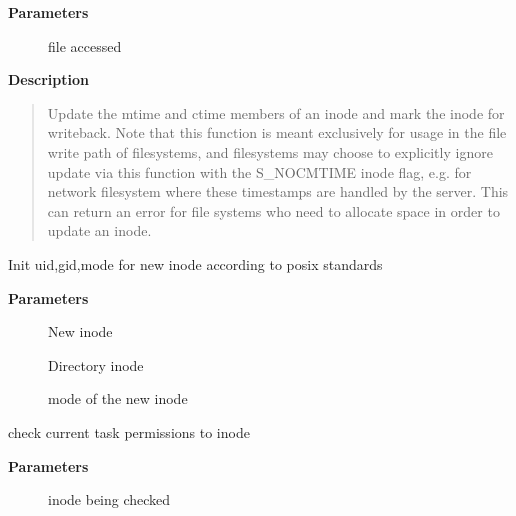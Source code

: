 \documentclass[a4paper,8pt,english]{sphinxmanual}
\begin{document}
\textbf{Parameters}
\begin{description}
\item[{}] \leavevmode
file accessed

\end{description}

\textbf{Description}
\begin{quote}

Update the mtime and ctime members of an inode and mark the inode
for writeback.  Note that this function is meant exclusively for
usage in the file write path of filesystems, and filesystems may
choose to explicitly ignore update via this function with the
S\_NOCMTIME inode flag, e.g. for network filesystem where these
timestamps are handled by the server.  This can return an error for
file systems who need to allocate space in order to update an inode.
\end{quote}

\begin{fulllineitems}
\label{filesystems/index:c.inode_init_owner}
Init uid,gid,mode for new inode according to posix standards

\end{fulllineitems}


\textbf{Parameters}
\begin{description}
\item[{}] \leavevmode
New inode

\item[{}] \leavevmode
Directory inode

\item[{}] \leavevmode
mode of the new inode

\end{description}

\begin{fulllineitems}
\label{filesystems/index:c.inode_owner_or_capable}
check current task permissions to inode

\end{fulllineitems}


\textbf{Parameters}
\begin{description}
\item[{}] \leavevmode
inode being checked

\end{description}
\end{document}
